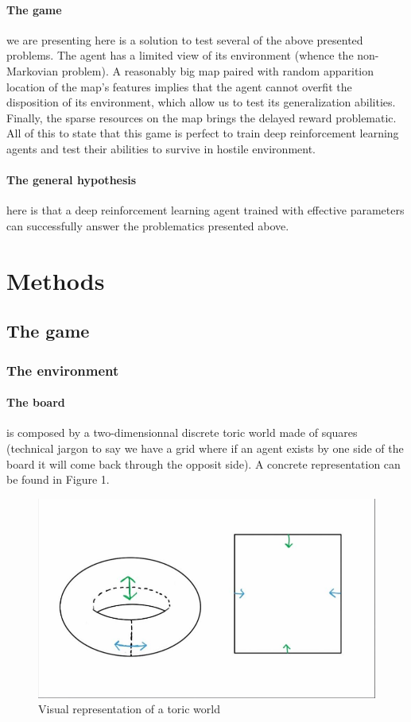 \documentclass{article}
\begin{document}
\paragraph{The game}
we are presenting here is a solution to test several of the above presented problems. The agent has a limited view of its environment (whence the non-Markovian problem). A reasonably big map paired with random apparition location of the map's features implies that the agent cannot overfit the disposition of its environment, which allow us to test its generalization abilities. Finally, the sparse resources on the map brings the delayed reward problematic. All of this to state that this game is perfect to train deep reinforcement learning agents and test their abilities to survive in hostile environment.

\paragraph{The general hypothesis}
here is that a deep reinforcement learning agent trained with effective parameters can successfully answer the problematics presented above.

\section{Methods}

\subsection{The game}

\subsubsection{The environment}

\paragraph{The board}
is composed by a two-dimensionnal discrete toric world made of squares (technical jargon to say we have a grid where if an agent exists by one side of the board it will come back through the opposit side). A concrete representation can be found in Figure 1.

\begin{figure}
\centering
\includegraphics[scale=0.2]{toric_world.png}
\caption{Visual representation of a toric world}
\end{figure}
\end{document}
